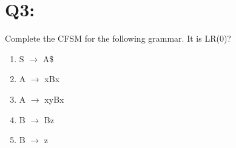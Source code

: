 \documentclass{report}
\begin{document}
\section{Q3:}
\noindent Complete the CFSM for the following grammar. It is LR(0)?
\begin{multicols}{2}
\begin{enumerate}
  \item S $\rightarrow$ A\$
  \item A $\rightarrow$ xBx
  \item A $\rightarrow$ xyBx
  \item B $\rightarrow$ Bz
  \item B $\rightarrow$ z\newline\newline\newline\newline\newline\newline\newline\newline\newline\newline\newline\newline
  \end{enumerate}
  \setlength{\leftskip}{-10em}

\end{multicols}
\end{document}
